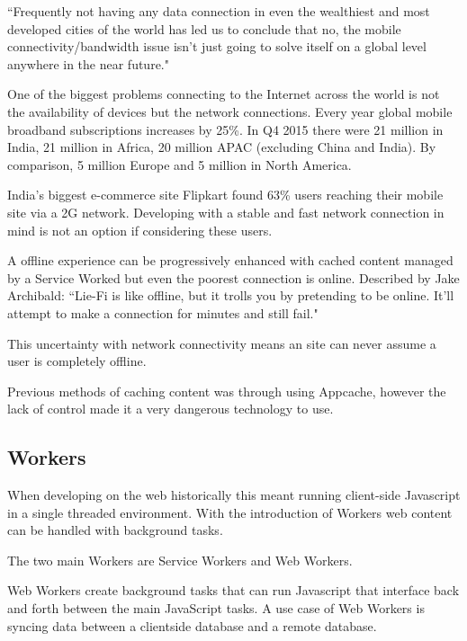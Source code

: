 ``Frequently not having any data connection in even the wealthiest and most developed cities of the world has led us to conclude that no, the mobile connectivity/bandwidth issue isn’t just going to solve itself on a global level anywhere in the near future." \cite{hello_to_offline_first}

One of the biggest problems connecting to the Internet across the world is not the availability of devices but the network connections. Every year global mobile broadband subscriptions increases by 25\%. In Q4 2015 there were 21 million in India, 21 million in Africa, 20 million APAC (excluding China and India). By comparison, 5 million Europe and 5 million in North America. \cite{ericsson}

India's biggest e-commerce site Flipkart found 63\% users reaching their mobile site via a 2G network. \cite{flipkart} Developing with a stable and fast network connection in mind is not an option if considering these users.


A offline experience can be progressively enhanced with cached content managed by a Service Worked but even the poorest connection is online. Described by Jake Archibald: ``Lie-Fi is like offline, but it trolls you by pretending to be online. It'll attempt to make a connection for minutes and still fail." \cite{supercharging_page_load}

This uncertainty with network connectivity means an site can never assume a user is completely offline.

Previous methods of caching content was through using Appcache, however the lack of control made it a very dangerous technology to use. %


\subsection{Workers} \label{l-r--workers}

When developing on the web historically this meant running client-side Javascript in a single threaded environment. With the introduction of Workers web content can be handled with background tasks.

The two main Workers are Service Workers and Web Workers.

Web Workers create background tasks that can run Javascript that interface back and forth between the main JavaScript tasks. A use case of Web Workers is syncing data between a clientside database and a remote database. \cite{using_web_workers}

